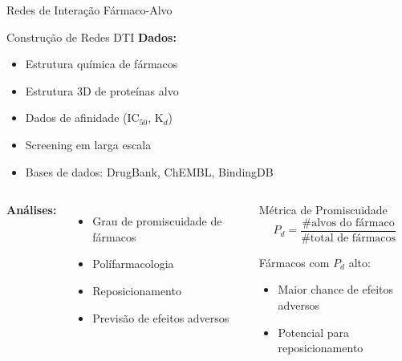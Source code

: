\begin{frame}{Redes de Interação Fármaco-Alvo}
\begin{block}{Construção de Redes DTI}
\textbf{Dados:}
\begin{itemize}
    \item Estrutura química de fármacos
    \item Estrutura 3D de proteínas alvo
    \item Dados de afinidade (IC$_{50}$, K$_d$)
    \item Screening em larga escala
    \item Bases de dados: DrugBank, ChEMBL, BindingDB
\end{itemize}
\end{block}

\vspace{0.3cm}

\begin{columns}
\textbf{Análises:}
\begin{itemize}
    \item Grau de promiscuidade de fármacos
    \item Polífarmacologia
    \item Reposicionamento
    \item Previsão de efeitos adversos
\end{itemize}

\begin{exampleblock}{Métrica de Promiscuidade}
\begin{equation*}
P_d = \frac{\text{\# alvos do fármaco}}{\text{\# total de fármacos}}
\end{equation*}

Fármacos com $P_d$ alto:
\begin{itemize}
    \item Maior chance de efeitos adversos
    \item Potencial para reposicionamento
\end{itemize}
\end{exampleblock}
\end{columns}
\end{frame}

